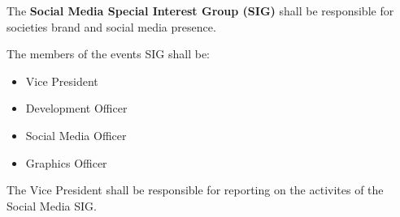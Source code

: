 \begin{clause}
    The \textbf{Social Media Special Interest Group (SIG)} shall be responsible for societies brand and social media presence.
\end{clause}

\begin{subclause}
    The members of the events SIG shall be:
    \begin{itemize}
        \item Vice President
        \item Development Officer
        \item Social Media Officer
        \item Graphics Officer
    \end{itemize}
\end{subclause}

\begin{subclause}
    The Vice President shall be responsible for reporting on the activites of the Social Media SIG.
\end{subclause}